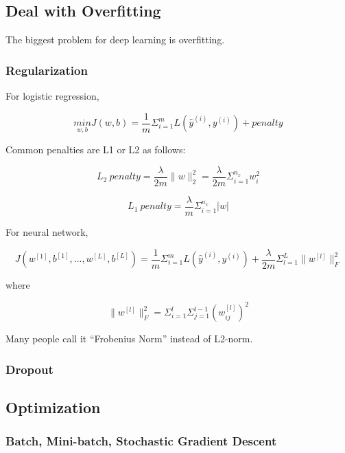 \documentclass[12pt,]{krantz}
\begin{document}
\hypertarget{deal-with-overfitting}{%
\subsection{Deal with Overfitting}\label{deal-with-overfitting}}

The biggest problem for deep learning is overfitting.

\hypertarget{regularization}{%
\subsubsection{Regularization}\label{regularization}}

For logistic regression,

\[\underset{w,b}{min}J(w,b)= \frac{1}{m} \Sigma_{i=1}^{m}L(\hat{y}^{(i)}, y^{(i)}) + penalty\]

Common penalties are L1 or L2 as follows:

\[L_2\ penalty=\frac{\lambda}{2m}\parallel w \parallel_2^2 = \frac{\lambda}{2m}\Sigma_{i=1}^{n_x}w_i^2\]

\[L_1\ penalty = \frac{\lambda}{m}\Sigma_{i=1}^{n_x}|w|\]

For neural network,

\[J(w^{[1]},b^{[1]},\dots,w^{[L]},b^{[L]})=\frac{1}{m}\Sigma_{i=1}^{m}L(\hat{y}^{(i)},y^{(i)}) + \frac{\lambda}{2m}\Sigma_{l=1}^{L} \parallel w^{[l]} \parallel^2_F\]

where

\[\parallel w^{[l]} \parallel^2_F = \Sigma_{i=1}^{l}\Sigma_{j=1}^{l-1} (w^{[l]}_{ij})^2\]

Many people call it ``Frobenius Norm'' instead of L2-norm.

\hypertarget{dropout}{%
\subsubsection{Dropout}\label{dropout}}

\hypertarget{optimization}{%
\subsection{Optimization}\label{optimization}}

\hypertarget{batch-mini-batch-stochastic-gradient-descent}{%
\subsubsection{Batch, Mini-batch, Stochastic Gradient Descent}\label{batch-mini-batch-stochastic-gradient-descent}}
\end{document}
